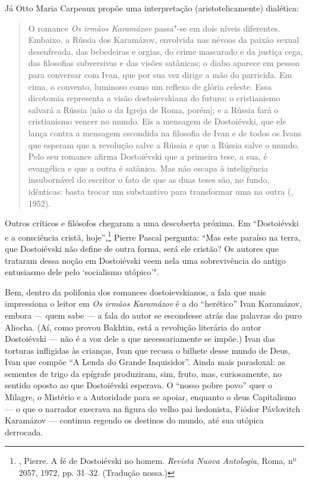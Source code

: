 Já Otto Maria Carpeaux propõe uma interpretação (aristotelicamente) dialética:

\begin{quotation}
O romance \emph{Os irmãos Karamázov} passa"-se em dois níveis diferentes. Embaixo, a Rússia dos Karamázov, envolvida nas névoas da paixão sexual desenfreada, das bebedeiras e orgias, do crime mascarado e da justiça cega, das filosofias subversivas e das visões satânicas; o diabo aparece em pessoa para conversar com Ivan, que por sua vez dirige a mão do parricida. Em cima, o convento, luminoso como um reflexo de glória celeste. Essa dicotomia representa a visão dostoievskiana do futuro: o cristianismo salvará a Rússia [não o da Igreja de Roma, porém]; e a Rússia fará o cristianismo vencer no mundo. Eis a mensagem de Dostoiévski, que ele lança contra a mensagem escondida na filosofia de Ivan e de todos os Ivans que esperam que a revolução salve a Rússia e que a Rússia salve o mundo. Pelo seu romance afirma Dostoiévski que a primeira tese, a sua, é evangélica e que a outra é satânica. Mas não escapa à inteligência insubornável do escritor o fato de que as duas teses são, no fundo, idênticas: basta trocar um substantivo para transformar uma na outra (, 1952). 
\end{quotation}

Outros críticos e filósofos chegaram a uma descoberta próxima. Em
``Dostoiévski e a consciência cristã, hoje'',\footnote{,
  Pierre. A fé de Dostoiévski no homem. \emph{Revista Nuova Antologia}, Roma, nº 2057, 1972, pp. 31--32. (Tradução nossa.)} Pierre Pascal
pergunta: ``Mas este paraíso na terra, que Dostoiévski não define
de outra forma, será ele cristão? Os autores que trataram dessa noção em
Dostoiévski veem nela uma sobrevivência do antigo entusiasmo dele pelo
`socialismo utópico'".

Bem, dentro da polifonia dos romances dostoievskianos, a fala que mais impressiona o leitor em \emph{Os irmãos Karamázov} é a do ``herético'' Ivan Karamázov, embora --- quem sabe --- a fala do autor se escondesse atrás das palavras do puro Aliocha. (Aí, como provou Bakhtin, está a revolução literária do autor Dostoiévski --- não é a voz dele a que necessariamente se impõe.) Ivan das torturas infligidas às crianças, Ivan que recusa o bilhete desse mundo de Deus, Ivan que compõe ``A Lenda do Grande Inquisidor''. Ainda mais paradoxal: as sementes de trigo da epígrafe produziram, sim, fruto, mas, curiosamente, no sentido oposto ao
que Dostoiévski esperava. O ``nosso pobre povo'' quer o Milagre, o
Mistério e a Autoridade para se apoiar, enquanto o deus
Capitalismo --- o que o narrador execrava na figura do velho
pai hedonista, Fiódor Pávlovitch Karamázov --- continua regendo
os destinos do mundo, até sua utópica derrocada.

